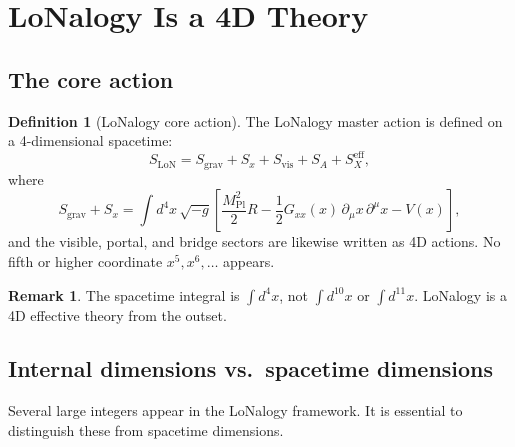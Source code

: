 \documentclass[12pt]{article}
\theoremstyle{plain}
\theoremstyle{definition}
\newtheorem{definition}[theorem]{Definition}
\newtheorem{remark}[theorem]{Remark}
\numberwithin{equation}{section}
\newcommand{\vis}{\mathrm{vis}}
\newcommand{\eff}{\mathrm{eff}}
\newcommand{\LoN}{\mathrm{LoN}}
\newcommand{\Pl}{\mathrm{Pl}}
\begin{document}
\section{LoNalogy Is a 4D Theory}\label{sec:4D}

\subsection{The core action}

\begin{definition}[LoNalogy core action]\label{def:action}
The LoNalogy master action is defined on a 4-dimensional spacetime:
\begin{equation}\label{eq:action}
S_{\LoN} = S_{\mathrm{grav}} + S_x + S_{\vis} + S_A + S_X^{\eff},
\end{equation}
where
\begin{equation}
S_{\mathrm{grav}}+S_x
= \int d^4x\,\sqrt{-g}\left[
\frac{M_{\Pl}^2}{2}R
-\frac{1}{2}G_{xx}(x)\,\partial_\mu x\,\partial^\mu x
-V(x)\right],
\end{equation}
and the visible, portal, and bridge sectors are likewise written as
4D actions.  No fifth or higher coordinate $x^5,x^6,\ldots$ appears.
\end{definition}

\begin{remark}
The spacetime integral is $\int d^4x$, not $\int d^{10}x$ or
$\int d^{11}x$.  LoNalogy is a 4D effective theory from the outset.
\end{remark}


\subsection{Internal dimensions vs.\ spacetime dimensions}

Several large integers appear in the LoNalogy framework.  It is
essential to distinguish these from spacetime dimensions.
\end{document}
